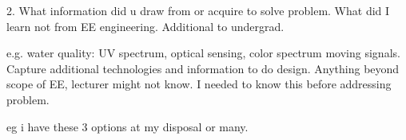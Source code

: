 2. What information did u draw from or acquire to solve problem. What did I learn not from EE engineering. Additional to undergrad. 

e.g. water quality: UV spectrum, optical sensing, color spectrum moving signals. Capture additional technologies and information to do design. Anything beyond scope of EE, lecturer might not know. I needed to know this before addressing problem. 

eg i have these 3 options at my disposal or many. 
